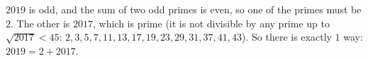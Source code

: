 $2019$ is odd, and the sum of two odd primes is even, so one of the primes must be $2$. The other is $2017$, which is prime (it is not divisible by any prime up to $\sqrt{2017}<45$: $2,3,5,7,11,13,17,19,23,29,31,37,41,43$). So there is exactly $\boxed{1}$ way: $2019=2+2017$.
